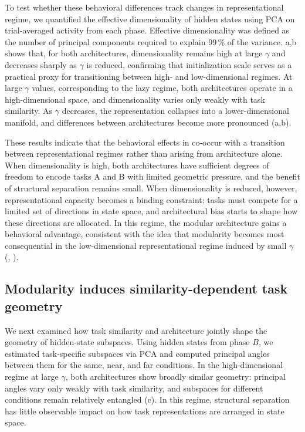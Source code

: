 \documentclass{article}
\theoremstyle{plain}
\theoremstyle{definition}
\theoremstyle{remark}
\begin{document}
To test whether these behavioral differences track changes in representational regime, we quantified the effective dimensionality of hidden states using PCA on trial-averaged activity from each phase. Effective dimensionality was defined as the number of principal components required to explain 99\,\% of the variance. a,b shows that, for both architectures, dimensionality remains high at large $\gamma$ and decreases sharply as $\gamma$ is reduced, confirming that initialization scale serves as a practical proxy for transitioning between high- and low-dimensional regimes. At large $\gamma$ values, corresponding to the lazy regime, both architectures operate in a high-dimensional space, and dimensionality varies only weakly with task similarity. As $\gamma$ decreases, the representation collapses into a lower-dimensional manifold, and differences between architectures become more pronounced (a,b).

These results indicate that the behavioral effects in  co-occur with a transition between representational regimes rather than arising from architecture alone. When dimensionality is high, both architectures have sufficient degrees of freedom to encode tasks A and B with limited geometric pressure, and the benefit of structural separation remains small. When dimensionality is reduced, however, representational capacity becomes a binding constraint: tasks must compete for a limited set of directions in state space, and architectural bias starts to shape how these directions are allocated. %
In this regime, the modular architecture gains a behavioral advantage, consistent with the idea that modularity becomes most consequential in the low-dimensional representational regime induced by small $\gamma$ (, ).

\subsection{Modularity induces similarity-dependent task geometry}

We next examined how task similarity and architecture jointly shape the geometry of hidden-state subspaces. Using hidden states from phase $B$, we estimated task-specific subspaces via PCA and computed principal angles between them for the same, near, and far conditions. In the high-dimensional regime at large $\gamma$, both architectures show broadly similar geometry: principal angles vary only weakly with task similarity, and subspaces for different conditions remain relatively entangled (c). In this regime, structural separation has little observable impact on how task representations are arranged in state space.
\end{document}
